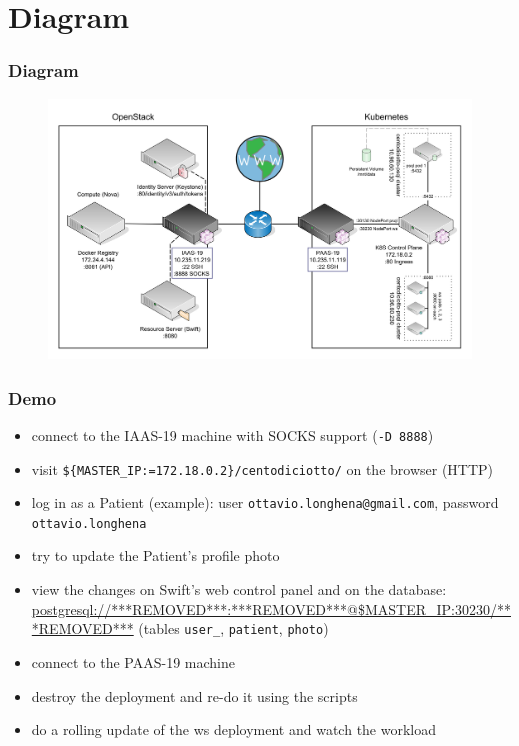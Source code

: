 \documentclass[handout,10pt]{beamer}
\title[FCC-21 Group Project]{}
\author[Group 19]{}
\institute[Facchinetti, Franzil]{}
\date[09/06/2021]{9 June 2021}
\begin{document}
\section{Diagram}

\begin{frame}
    \frametitle{Diagram}
    \begin{figure}
    	\centering
    	\includegraphics[height=0.8\textheight]{diagram/diagram.png}
	\end{figure}
\end{frame}

\begin{frame}
    \frametitle{Demo}
    \begin{itemize}
		\item connect to the IAAS-19 machine with SOCKS support (\texttt{-D 8888})
		\item visit \texttt{\$\{MASTER\_IP:=172.18.0.2\}/centodiciotto/} on the browser (HTTP)
		\item log in as a Patient (example): user \texttt{ottavio.longhena@gmail.com}, password \texttt{ottavio.longhena}
		\item try to update the Patient's profile photo
		\item view the changes on Swift's web control panel and on the database: \url{postgresql://***REMOVED***:***REMOVED***@$MASTER_IP:30230/***REMOVED***} (tables \texttt{user_}, \texttt{patient}, \texttt{photo})
		\item connect to the PAAS-19 machine
		\item destroy the deployment and re-do it using the scripts
		\item do a rolling update of the ws deployment and watch the workload
	\end{itemize}
\end{frame}
\end{document}

